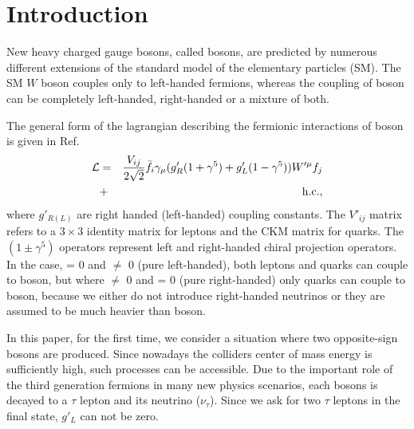 \section{Introduction}\label{sec:int} 
New heavy charged gauge bosons, called \wprime bosons, are predicted by numerous different extensions of the standard model of the elementary particles (SM). 
The SM $W$ boson couples only to left-handed fermions, whereas the coupling of \wprime boson can be completely left-handed, right-handed or a mixture of both. 

The general form of the lagrangian describing the fermionic interactions of \wprime boson is given in  Ref.~\cite{Sullivan:2002jt}
\begin{eqnarray}
{\cal L}& =& \frac{V_{ij}}{2\sqrt{2}}\bar{f_i} \gamma_{\mu}(g^\prime_{R} (1+{\gamma}^5)+
g^\prime_{L}
(1-{\gamma}^5)) W^{\prime \mu} f_j  \nonumber\\
&+& \mathrm{h.c.},
\end{eqnarray}
where $g'_{R(L)}$ are right handed (left-handed) coupling constants. The $V'_{ij}$ matrix refers to a $3\times3$ identity matrix for leptons and the CKM matrix for quarks. The $(1\pm{\gamma^5})$ operators represent left and right-handed chiral projection operators. In the case, \gR = 0 and \gL $\neq$ 0 (pure left-handed), both leptons and quarks can couple to \wprime boson, but where \gR $\neq$ 0 and \gL = 0 (pure right-handed) only quarks can couple to \wprime boson, because we either do not introduce right-handed neutrinos or they are assumed to be much heavier than \wprime boson. 

In this paper, for the first time, we consider a situation where two opposite-sign \wprime bosons are produced. Since nowadays the colliders center of mass energy is sufficiently high, such processes can be accessible. Due to the important role of the third generation fermions in many new physics scenarios, each \wprime bosons is decayed to a $\tau$ lepton and its neutrino ($\nu_{\tau}$). 
Since we ask for two $\tau$ leptons in the final state, $g'_L$ can not be zero. 

